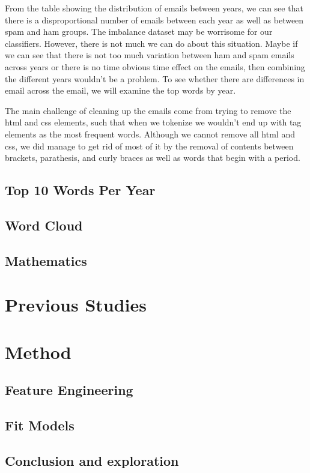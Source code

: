 \documentclass[12pt]{article}
\begin{document}
From the table showing the distribution of emails between years, we can see that there is a disproportional number of emails between each year as well as between spam and ham groups. The imbalance dataset may be worrisome for our classifiers. However, there is not much we can do about this situation. Maybe if we can see that there is not too much variation between ham and spam emails across years or there is no time obvious time effect on the emails, then combining the different years wouldn't be a problem. To see whether there are differences in email across the email, we will examine the top words by year. 

The main challenge of cleaning up the emails come from trying to remove the html and css elements, such that when we tokenize we wouldn't end up with tag elements as the most frequent words. Although we cannot remove all html and css, we did manage to get rid of most of it by the removal of contents between brackets, parathesis, and curly braces as well as words that begin with a period.  

%


\subsection{Top 10 Words Per Year}



\subsection{Word Cloud}

\subsection{Mathematics}

\section{Previous Studies}

\section{Method}

\subsection{Feature Engineering}

\subsection{Fit Models}

\subsection{Conclusion and exploration}
\end{document}
